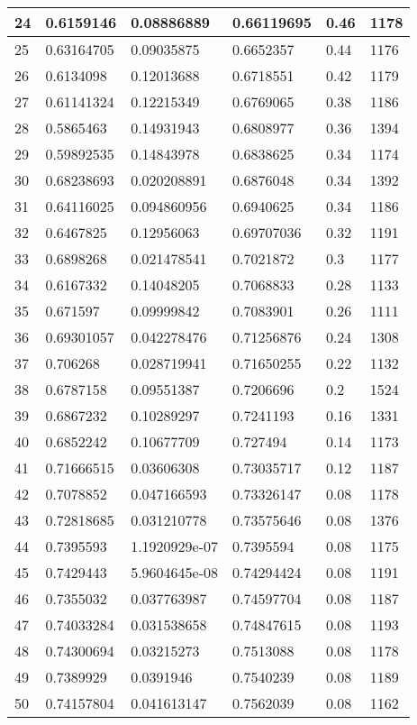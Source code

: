 \begin{longtable}{|l|l|l|l|l|l|}
24 & 0.6159146 & 0.08886889 & 0.66119695 & 0.46 & 1178 \\ \hline 
25 & 0.63164705 & 0.09035875 & 0.6652357 & 0.44 & 1176 \\ \hline 
26 & 0.6134098 & 0.12013688 & 0.6718551 & 0.42 & 1179 \\ \hline 
27 & 0.61141324 & 0.12215349 & 0.6769065 & 0.38 & 1186 \\ \hline 
28 & 0.5865463 & 0.14931943 & 0.6808977 & 0.36 & 1394 \\ \hline 
29 & 0.59892535 & 0.14843978 & 0.6838625 & 0.34 & 1174 \\ \hline 
30 & 0.68238693 & 0.020208891 & 0.6876048 & 0.34 & 1392 \\ \hline 
31 & 0.64116025 & 0.094860956 & 0.6940625 & 0.34 & 1186 \\ \hline 
32 & 0.6467825 & 0.12956063 & 0.69707036 & 0.32 & 1191 \\ \hline 
33 & 0.6898268 & 0.021478541 & 0.7021872 & 0.3 & 1177 \\ \hline 
34 & 0.6167332 & 0.14048205 & 0.7068833 & 0.28 & 1133 \\ \hline 
35 & 0.671597 & 0.09999842 & 0.7083901 & 0.26 & 1111 \\ \hline 
36 & 0.69301057 & 0.042278476 & 0.71256876 & 0.24 & 1308 \\ \hline 
37 & 0.706268 & 0.028719941 & 0.71650255 & 0.22 & 1132 \\ \hline 
38 & 0.6787158 & 0.09551387 & 0.7206696 & 0.2 & 1524 \\ \hline 
39 & 0.6867232 & 0.10289297 & 0.7241193 & 0.16 & 1331 \\ \hline 
40 & 0.6852242 & 0.10677709 & 0.727494 & 0.14 & 1173 \\ \hline 
41 & 0.71666515 & 0.03606308 & 0.73035717 & 0.12 & 1187 \\ \hline 
42 & 0.7078852 & 0.047166593 & 0.73326147 & 0.08 & 1178 \\ \hline 
43 & 0.72818685 & 0.031210778 & 0.73575646 & 0.08 & 1376 \\ \hline 
44 & 0.7395593 & 1.1920929e-07 & 0.7395594 & 0.08 & 1175 \\ \hline 
45 & 0.7429443 & 5.9604645e-08 & 0.74294424 & 0.08 & 1191 \\ \hline 
46 & 0.7355032 & 0.037763987 & 0.74597704 & 0.08 & 1187 \\ \hline 
47 & 0.74033284 & 0.031538658 & 0.74847615 & 0.08 & 1193 \\ \hline 
48 & 0.74300694 & 0.03215273 & 0.7513088 & 0.08 & 1178 \\ \hline 
49 & 0.7389929 & 0.0391946 & 0.7540239 & 0.08 & 1189 \\ \hline 
50 & 0.74157804 & 0.041613147 & 0.7562039 & 0.08 & 1162 \\ \hline 
\end{longtable}